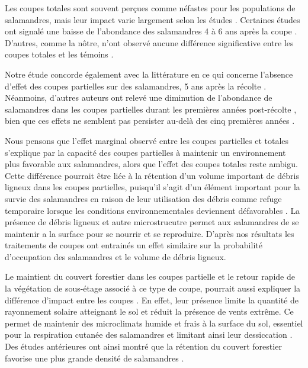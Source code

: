 Les coupes totales sont souvent perçues comme néfastes pour les populations de salamandres, mais leur impact varie largement selon les études \citep{Hocking2013Effectsexperimental,Chaudhary2016Impactforest}. 
Certaines études ont signalé une baisse de l'abondance des salamandres 4 à 6 ans après la coupe \citep{Petranka1993Effectstimber,Herbeck1999PlethodontidSalamander,Grialou2000effectsforest,Macneil2014Effectstimber}. 
D'autres, comme la nôtre, n'ont observé aucune différence significative entre les coupes totales et les témoins \citep{Renken2004EffectsForest,Mazerolle2021Woodlandsalamander}. 

Notre étude concorde également avec la littérature en ce qui concerne l'absence d'effet des coupes partielles sur des salamandres, 5 ans après la récolte \citep{McKenny2006Effectsstructural,Mazerolle2021Woodlandsalamander,Ochs2022Responseterrestrial}. 
Néanmoins, d'autres auteurs ont relevé une diminution de l'abondance de salamandres dans les coupes partielles durant les premières années post-récolte \citep{Harpole1999Effectsseven,Knapp2003Initialeffects,Morneault2004effectshelterwood}, 
bien que ces effets ne semblent pas persister au-delà des cinq premières années \citep{Morneault2004effectshelterwood}.

Nous pensons que l'effet marginal observé entre les coupes partielles et totales s'explique par la capacité des coupes partielles à maintenir un environnement plus favorable aux salamandres, 
alors que l'effet des coupes totales reste ambigu. 
Cette différence pourrait être liée à la rétention d'un volume important de débris ligneux dans les coupes partielles, 
puisqu'il s'agit d'un élément important pour la survie des salamandres en raison de leur utilisation des débris comme refuge temporaire lorsque les conditions environnementales deviennent défavorables \citep{Nolet2018Comparingeffects,Peterman2014Spatialvariation,Achat2015Quantifyingconsequences,Peele2017Effectswoody}.
La présence de débris ligneux et autre microstrucutre permet aux salamandres de se maintenir a la surface pour se nourrir et se reproduire. 
D'après nos résultats les traitements de coupes ont entrainés un effet similaire sur la probabilité d'occupation des salamandres et le volume de débris ligneux.

Le maintient du couvert forestier dans les coupes partielle et le retour rapide de la végétation de sous-étage associé à ce type de coupe, pourrait aussi expliquer la différence d'impact entre les coupes \citep{Raybuck2015silviculturalpractices}.
En effet, leur présence limite la quantité de rayonnement solaire atteignant le sol et réduit la présence de vents extrême. 
Ce permet de maintenir des microclimats humide et frais à la surface du sol, essentiel pour la respiration cutanée des salamandres et limitant ainsi leur dessiccation \citep{Homyack2011Energeticssurfaceactive}. 
Des études antérieures ont ainsi montré que la rétention du couvert forestier favorise une plus grande densité de salamandres \citep{Hocking2013Effectsexperimental,Harper2015Impactforestry,Mahoney2016Woodlandsalamander}. 


